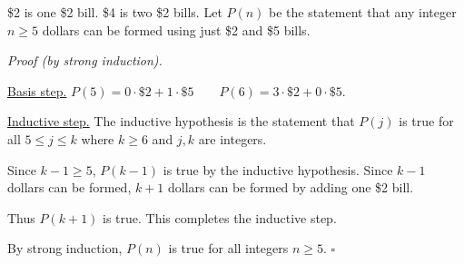 \documentclass{article}
\begin{document}
\begin{enumerate}
    \$2 is one \$2 bill. \$4 is two \$2 bills. Let $P(n)$ be the statement that any integer $n \ge 5$ dollars can be formed using just \$2 and \$5 bills.

    \textit{Proof (by strong induction).}

    \underline{Basis step.} $P(5) = 0\cdot \$2 + 1 \cdot \$5 \qquad P(6) = 3\cdot \$2 + 0 \cdot \$5$.

    \underline{Inductive step.} The inductive hypothesis is the statement that $P(j)$ is true for all $5 \le j \le k$ where $k \ge 6$ and $j,k$ are integers.

    Since $k-1 \ge 5$, $P(k-1)$ is true by the inductive hypothesis. Since $k-1$ dollars can be formed, $k+1$ dollars can be formed by adding one \$2 bill.

    Thus $P(k+1)$ is true. This completes the inductive step.

    By strong induction, $P(n)$ is true for all integers $n \ge 5$. $\square$
\end{enumerate}
\end{document}
